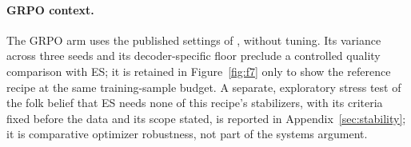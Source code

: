 \paragraph{GRPO context.} The GRPO arm \citep{deepseekmath2024} uses the
published settings of \citet{qiu2025}, without tuning. Its variance across
three seeds and its decoder-specific floor preclude a controlled quality
comparison with ES; it is retained in Figure~\ref{fig:f7} only to show the
reference recipe at the same training-sample budget. A separate,
exploratory stress test of the folk belief that ES needs none of this
recipe's stabilizers, with its criteria fixed before the data and its scope
stated, is reported in Appendix~\ref{sec:stability}; it is comparative
optimizer robustness, not part of the systems argument.

